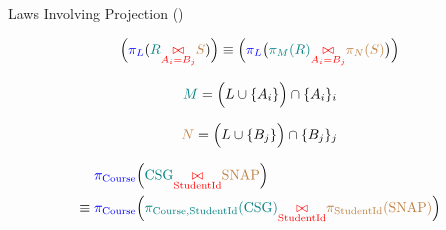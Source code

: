 
\begin{frame}{}
\end{frame}


\begin{frame}
  \centerline{\Large Laws Involving Projection ()}

  \vspace{0.40cm}
  \[
    \Big(\textcolor{blue}{\pi_{L}}(\textcolor{teal}{R} \textcolor{red}{\underset{A_i = B_j} \bowtie} \textcolor{brown}{S})\Big) \equiv 
      \Big(\textcolor{blue}{\pi_{L}}\big(\textcolor{teal}{\pi_{M}(R)} \textcolor{red}{\underset{A_i = B_j} \bowtie} \textcolor{brown}{\pi_{N}(S)}\big)\Big)
  \]

  \[
    \textcolor{teal}{M} = \Big(L \cup \{A_i\}\Big) \cap \{A_i\}_{i}
  \]

  \[
    \textcolor{brown}{N} = \Big(L \cup \{B_j\}\Big) \cap \{B_j\}_{j}
  \]
\end{frame}

\begin{frame}{}

  \vspace{-0.50cm}
  \begin{align*}
    &\textcolor{blue}{\pi_{\text{Course}{}}} \Big(\textcolor{teal}{\text{CSG}{}} \textcolor{red}{\underset{\text{StudentId}{}}{\bowtie}} \textcolor{brown}{\text{SNAP}{}} \Big) \\
    \equiv\; &\textcolor{blue}{\pi_{\text{Course}{}}} \Big(\textcolor{teal}{\pi_{\text{Course},\text{StudentId}} (\text{CSG})} \textcolor{red}{\underset{\text{StudentId}{}}{\bowtie}} \textcolor{brown}{\pi_{\text{StudentId}{}}(\text{SNAP}{})}\Big)
  \end{align*}
\end{frame}

\begin{frame}{}
\end{frame}
